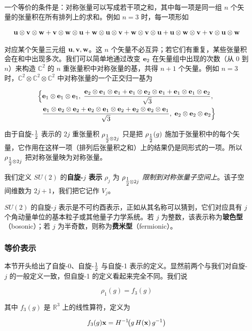 一个等价的条件是：对称张量可以写成若干项之和，其中每一项是同一组 $n$ 个矢量的张量积在所有排列上的求和。例如 $n=3$ 时，每一项形如

\[
\mathbf{u}\otimes\mathbf{v}\otimes\mathbf{w}+\mathbf{v}\otimes\mathbf{w}\otimes\mathbf{u}+\mathbf{w}\otimes\mathbf{u}\otimes\mathbf{v}
+\mathbf{w}\otimes\mathbf{v}\otimes\mathbf{u}+\mathbf{u}\otimes\mathbf{w}\otimes\mathbf{v}+\mathbf{v}\otimes\mathbf{u}\otimes\mathbf{w}
\]

对应某个矢量三元组 $\mathbf{u},\mathbf{v},\mathbf{w}$。这 $n$ 个矢量不必互异；若它们有重复，某些张量积会在和中出现多次。我们可以简单地通过改变 $\mathbf{e}_{2}$ 在矢量组中出现的次数（从 0 到 $n$）来构造 $\mathbb{C}^{2}$ 的 $n$ 重张量积中对称张量的基，共得 $n+1$ 个矢量。例如 $n=3$ 时，$\mathbb{C}^{2}\otimes\mathbb{C}^{2}\otimes\mathbb{C}^{2}$ 中对称张量的一个正交归一基为

\begin{align*}
\Bigl\{&\mathbf{e}_{1}\otimes\mathbf{e}_{1}\otimes\mathbf{e}_{1},\;
\frac{\mathbf{e}_{2}\otimes\mathbf{e}_{1}\otimes\mathbf{e}_{1}+\mathbf{e}_{1}\otimes\mathbf{e}_{2}\otimes\mathbf{e}_{1}+\mathbf{e}_{1}\otimes\mathbf{e}_{1}\otimes\mathbf{e}_{2}}{\sqrt{3}},\\
&\frac{\mathbf{e}_{1}\otimes\mathbf{e}_{2}\otimes\mathbf{e}_{2}+\mathbf{e}_{2}\otimes\mathbf{e}_{1}\otimes\mathbf{e}_{2}+\mathbf{e}_{2}\otimes\mathbf{e}_{2}\otimes\mathbf{e}_{1}}{\sqrt{3}},\;
\mathbf{e}_{2}\otimes\mathbf{e}_{2}\otimes\mathbf{e}_{2}\Bigr\}
\end{align*}

由于自旋-$\tfrac{1}{2}$ 表示的 $2j$ 重张量积 $\rho_{\tfrac{1}{2}\otimes 2j}$ 只是把 $\rho_{\tfrac{1}{2}}(g)$ 施加于张量积中的每个矢量，它作用在这样一项（排列后张量积之和）上的结果仍是同形式的一项。所以 $\rho_{\tfrac{1}{2}\otimes 2j}$ 把对称张量映为对称张量。

我们定义 $SU(2)$ 的\textbf{自旋-$j$ 表示} $\rho_{j}$ 为 $\rho_{\tfrac{1}{2}\otimes 2j}$ \emph{限制到对称张量子空间上}。该子空间维数为 $2j+1$，我们把它记作 $V_{j}$。

$SU(2)$ 的自旋-$j$ 表示是不可约酉表示，正如从其名称可以猜到，它们对应具有 $j$ 个角动量单位的基本粒子或其他量子力学系统。若 $j$ 为整数，该表示称为\textbf{玻色型}（bosonic）；若 $j$ 为半奇数，则称为\textbf{费米型}（fermionic）。

\subsubsection{等价表示}

本节开头给出了自旋-0、自旋-$\tfrac{1}{2}$ 与自旋-1 表示的定义。显然前两个与我们对自旋-$j$ 的一般定义一致，但自旋-1 的定义看起来完全不同。我们说

\[
\rho_{1}(g)=f_{3}(g)
\]

其中 $f_{3}(g)$ 是 $\mathbb{R}^{3}$ 上的线性算符，定义为

\[
f_{3}(g)\mathbf{x}=H^{-1}\!\bigl(g\,H(\mathbf{x})\,g^{-1}\bigr)
\]

